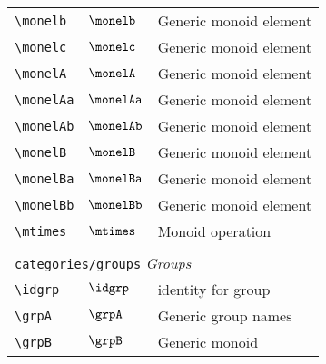 \begin{longtable}{lll}
  {\color[rgb]{0.5,0.5,0.5}\texttt{\textbackslash monelb}}                                                  & $\monelb$                  & Generic monoid element\\
  {\color[rgb]{0.5,0.5,0.5}\texttt{\textbackslash monelc}}                                                  & $\monelc$                  & Generic monoid element\\
  {\color[rgb]{0.5,0.5,0.5}\texttt{\textbackslash monelA}}                                                  & $\monelA$                  & Generic monoid element\\
  {\color[rgb]{0.5,0.5,0.5}\texttt{\textbackslash monelAa}}                                                 & $\monelAa$                 & Generic monoid element\\
  {\color[rgb]{0.5,0.5,0.5}\texttt{\textbackslash monelAb}}                                                 & $\monelAb$                 & Generic monoid element\\
  {\color[rgb]{0.5,0.5,0.5}\texttt{\textbackslash monelB}}                                                  & $\monelB$                  & Generic monoid element\\
  {\color[rgb]{0.5,0.5,0.5}\texttt{\textbackslash monelBa}}                                                 & $\monelBa$                 & Generic monoid element\\
  {\color[rgb]{0.5,0.5,0.5}\texttt{\textbackslash monelBb}}                                                 & $\monelBb$                 & Generic monoid element\\
  {\color[rgb]{0.5,0.5,0.5}\texttt{\textbackslash mtimes}}                                                  & $\mtimes$                  & Monoid operation                                        \\
  &                            &                                                         \\
  \multicolumn{3}{l}{{\color[rgb]{0.5,0.5,0.5}\texttt{categories/groups}} \emph{Groups}}
  \\
  \hline
  {\color[rgb]{0.5,0.5,0.5}\texttt{\textbackslash idgrp}}                                                   & $\idgrp$                   & identity for group\\
  {\color[rgb]{0.5,0.5,0.5}\texttt{\textbackslash grpA}}                                                    & $\grpA$                    & Generic group names\\
  {\color[rgb]{0.5,0.5,0.5}\texttt{\textbackslash grpB}}                                                    & $\grpB$                    & Generic monoid\\

\end{longtable}
